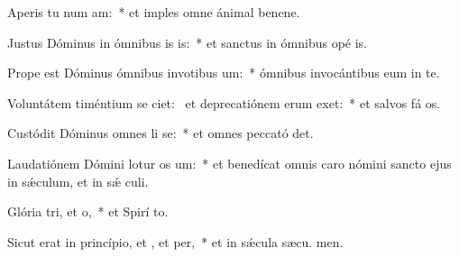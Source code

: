 \item Aperis tu num am:~* et imples omne ánimal benene.
\item Justus Dóminus in ómnibus is is:~* et sanctus in ómnibus opé is.
\item Prope est Dóminus ómnibus invotibus um:~* ómnibus invocántibus eum in te.
\item Voluntátem timéntium se ciet:~\pscross{} et deprecatiónem erum exet:~* et salvos fá os.
\item Custódit Dóminus omnes li se:~* et omnes peccató det.
\item Laudatiónem Dómini lotur os um:~* et benedícat omnis caro nómini sancto ejus in sǽculum, et in sǽ culi.
\item Glória tri, et o,~* et Spirí to.
\item Sicut erat in princípio, et , et per,~* et in sǽcula sæcu. men.
